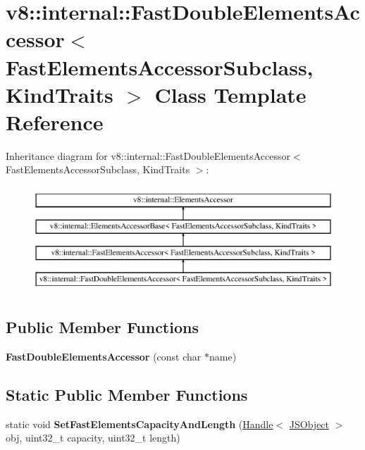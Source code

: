 \hypertarget{classv8_1_1internal_1_1_fast_double_elements_accessor}{}\section{v8\+:\+:internal\+:\+:Fast\+Double\+Elements\+Accessor$<$ Fast\+Elements\+Accessor\+Subclass, Kind\+Traits $>$ Class Template Reference}
\label{classv8_1_1internal_1_1_fast_double_elements_accessor}
Inheritance diagram for v8\+:\+:internal\+:\+:Fast\+Double\+Elements\+Accessor$<$ Fast\+Elements\+Accessor\+Subclass, Kind\+Traits $>$\+:\begin{figure}[H]
\begin{center}
\leavevmode
\includegraphics[height=4.000000cm]{classv8_1_1internal_1_1_fast_double_elements_accessor}
\end{center}
\end{figure}
\subsection*{Public Member Functions}
\begin{DoxyCompactItemize}
\item 
\hypertarget{classv8_1_1internal_1_1_fast_double_elements_accessor_a2bb5bbffd0b2753f5879e6b92bbd0056}{}{\bfseries Fast\+Double\+Elements\+Accessor} (const char $\ast$name)\label{classv8_1_1internal_1_1_fast_double_elements_accessor_a2bb5bbffd0b2753f5879e6b92bbd0056}

\end{DoxyCompactItemize}
\subsection*{Static Public Member Functions}
\begin{DoxyCompactItemize}
\item 
\hypertarget{classv8_1_1internal_1_1_fast_double_elements_accessor_ad1252940d25047f44aa411de3f987c8d}{}static void {\bfseries Set\+Fast\+Elements\+Capacity\+And\+Length} (\hyperlink{classv8_1_1internal_1_1_handle}{Handle}$<$ \hyperlink{classv8_1_1internal_1_1_j_s_object}{J\+S\+Object} $>$ obj, uint32\+\_\+t capacity, uint32\+\_\+t length)\label{classv8_1_1internal_1_1_fast_double_elements_accessor_ad1252940d25047f44aa411de3f987c8d}

\end{DoxyCompactItemize}
